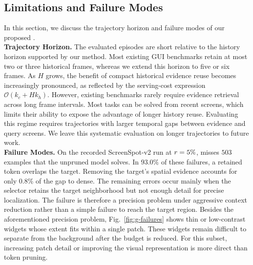 \subsection{Limitations and Failure Modes}
\label{app:limits}
In this section, we discuss the trajectory horizon and failure modes of our proposed \method{}.
\\
\noindent\textbf{Trajectory Horizon.}
%
The evaluated episodes are short relative to the history horizon supported by our method. Most existing GUI benchmarks retain at most two or three historical frames, whereas we extend this horizon to five or six frames. As $H$ grows, the benefit of compact historical evidence reuse becomes increasingly pronounced, as reflected by the serving-cost expression $\mathcal{O}(k_c+Hk_h)$.
%
However, existing benchmarks rarely require evidence retrieval across long frame intervals. Most tasks can be solved from recent screens, which limits their ability to expose the advantage of longer history reuse. Evaluating this regime requires trajectories with larger temporal gaps between evidence and query screens. 
%
We leave this systematic evaluation on longer trajectories to future work.
\\
\noindent\textbf{Failure Modes.}
On the recorded ScreenSpot-v2 run at $r=5\%$, \method{} misses $503$ examples that the unpruned model solves. In $93.0\%$ of these failures, a retained token overlaps the target. Removing the target's spatial evidence accounts for only $0.8\%$ of the gap to dense.
%
The remaining errors occur mainly when the selector retains the target neighborhood but not enough detail for precise localization. The failure is therefore a precision problem under aggressive context reduction rather than a simple failure to reach the target region.
%
Besides the aforementioned precision problem, Fig.~\ref{fig:g-failures} shows thin or low-contrast widgets whose extent fits within a single patch. These widgets remain difficult to separate from the background after the budget is reduced. For this subset, increasing patch detail or improving the visual representation is more direct than token pruning.
